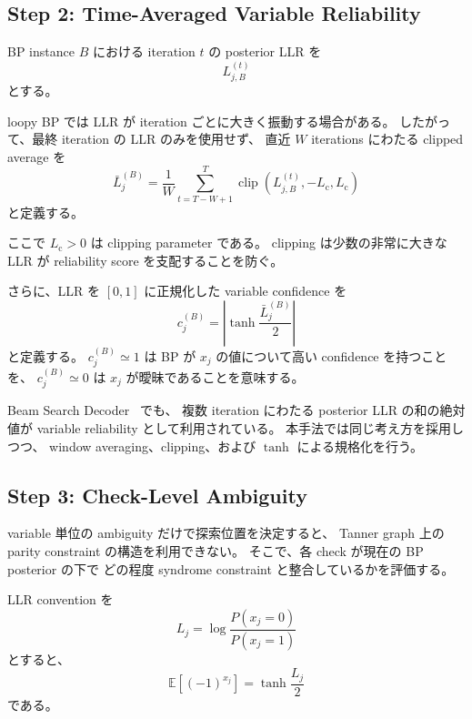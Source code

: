 \subsection{Step 2: Time-Averaged Variable Reliability}

BP instance $B$ における iteration $t$ の posterior LLR を
\begin{equation}
    L_{j,B}^{(t)}
\end{equation}
とする。

loopy BP では LLR が iteration ごとに大きく振動する場合がある。
したがって、最終 iteration の LLR のみを使用せず、
直近 $W$ iterations にわたる clipped average を
\begin{equation}
    \bar L_j^{(B)}
    =
    \frac{1}{W}
    \sum_{t=T-W+1}^{T}
    \operatorname{clip}
    \left(
        L_{j,B}^{(t)},-L_{\mathrm c},L_{\mathrm c}
    \right)
    \label{eq:average_llr}
\end{equation}
と定義する。

ここで $L_{\mathrm c}>0$ は clipping parameter である。
clipping は少数の非常に大きな LLR が reliability score を支配することを防ぐ。

さらに、LLR を $[0,1]$ に正規化した variable confidence を
\begin{equation}
    c_j^{(B)}
    =
    \left|
        \tanh\frac{\bar L_j^{(B)}}{2}
    \right|
    \label{eq:variable_confidence}
\end{equation}
と定義する。
$c_j^{(B)}\simeq 1$ は BP が $x_j$ の値について高い confidence を持つことを、
$c_j^{(B)}\simeq0$ は $x_j$ が曖昧であることを意味する。

Beam Search Decoder~\cite{beamsearch} でも、
複数 iteration にわたる posterior LLR の和の絶対値が
variable reliability として利用されている。
本手法では同じ考え方を採用しつつ、
window averaging、clipping、および $\tanh$ による規格化を行う。


\subsection{Step 3: Check-Level Ambiguity}

variable 単位の ambiguity だけで探索位置を決定すると、
Tanner graph 上の parity constraint の構造を利用できない。
そこで、各 check が現在の BP posterior の下で
どの程度 syndrome constraint と整合しているかを評価する。

LLR convention を
\begin{equation}
    L_j
    =
    \log
    \frac{P(x_j=0)}{P(x_j=1)}
\end{equation}
とすると、
\begin{equation}
    \mathbb{E}[(-1)^{x_j}]
    =
    \tanh\frac{L_j}{2}
\end{equation}
である。

